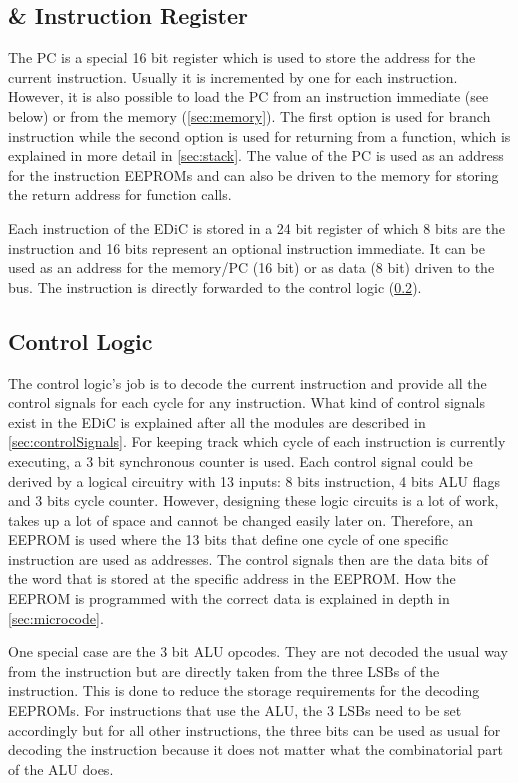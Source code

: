 \subsection{ \& Instruction Register}
The \gls{PC} is a special 16 bit register which is used to store the address for the current instruction.
Usually it is incremented by one for each instruction.
However, it is also possible to load the \gls{PC} from an instruction immediate (see below) or from the memory (\cref{sec:memory}).
The first option is used for branch instruction while the second option is used for returning from a function, which is explained in more detail in \cref{sec:stack}.
The value of the \gls{PC} is used as an address for the instruction \glspl{EEPROM} and can also be driven to the memory for storing the return address for function calls.

Each instruction of the \gls{EDiC} is stored in a 24 bit register of which 8 bits are the instruction and 16 bits represent an optional instruction immediate.
It can be used as an address for the memory/\gls{PC} (16 bit) or as data (8 bit) driven to the bus.
The instruction is directly forwarded to the control logic (\cref{sec:control}).

\subsection{Control Logic}\label{sec:control}
The control logic's job is to decode the current instruction and provide all the control signals for each cycle for any instruction.
What kind of control signals exist in the \gls{EDiC} is explained after all the modules are described in \cref{sec:controlSignals}.
For keeping track which cycle of each instruction is currently executing, a 3 bit synchronous counter is used.
Each control signal could be derived by a logical circuitry with 13 inputs: 8 bits instruction, 4 bits \gls{ALU} flags and 3 bits cycle counter.
However, designing these logic circuits is a lot of work, takes up a lot of space and cannot be changed easily later on.
Therefore, an \gls{EEPROM} is used where the 13 bits that define one cycle of one specific instruction are used as addresses.
The control signals then are the data bits of the word that is stored at the specific address in the \gls{EEPROM}.
How the \gls{EEPROM} is programmed with the correct data is explained in depth in \cref{sec:microcode}.

One special case are the 3 bit \gls{ALU} opcodes.
They are not decoded the usual way from the instruction but are directly taken from the three \glspl{LSB} of the instruction.
This is done to reduce the storage requirements for the decoding \glspl{EEPROM}.
For instructions that use the \gls{ALU}, the 3 \glspl{LSB} need to be set accordingly but for all other instructions, the three bits can be used as usual for decoding the instruction because it does not matter what the combinatorial part of the \gls{ALU} does.

